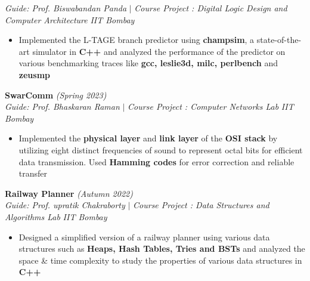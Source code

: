 \documentclass[a4paper,10pt]{article}
\begin{document}
{\it Guide: Prof. Biswabandan Panda} $|$ {\it Course Project : Digital Logic Design and Computer Architecture } \hfill{\it IIT Bombay}
\vspace{-2pt}
\begin{itemize}[itemsep = -0.65 mm, leftmargin=*]
    \item Implemented the L-TAGE branch predictor using \textbf{champsim}, a state-of-the-art simulator in \textbf{C++} and analyzed the performance of the predictor on various benchmarking traces like \textbf{gcc, leslie3d, milc, perlbench} and \textbf{zeusmp}
\end{itemize}
\vspace{\baselineskip}
\vspace{-15pt}
\noindent\textbf{\large SwarComm} \hfill{\sl \small (Spring 2023)}\\
{\it Guide: Prof. Bhaskaran Raman} $|$ {\it Course Project : Computer Networks Lab} \hfill{\it IIT Bombay}
\vspace{-2pt}
\begin{itemize}[itemsep = -0.65 mm, leftmargin=*]
    \item Implemented the \textbf{physical layer} and \textbf{link layer} of the \textbf{OSI stack} by utilizing eight distinct frequencies of sound to represent octal bits for efficient data transmission. Used \textbf{Hamming codes} for error correction and reliable transfer
\end{itemize}
\vspace{\baselineskip}
\vspace{-10pt}
\noindent\textbf{\large Railway Planner} \hfill{\sl \small (Autumn 2022)}\\
{\it Guide: Prof. upratik Chakraborty} $|$ {\it Course Project : Data Structures and Algorithms Lab } \hfill{\it IIT Bombay}
\vspace{-3pt}
\begin{itemize}[itemsep = -0.65 mm, leftmargin=*]
    \item Designed a simplified version of a railway planner using various data structures such as \textbf{Heaps, Hash Tables, Tries and BSTs} and analyzed the space \& time complexity to study the properties of various data structures in \textbf{C++}
\end{itemize}
\end{document}
